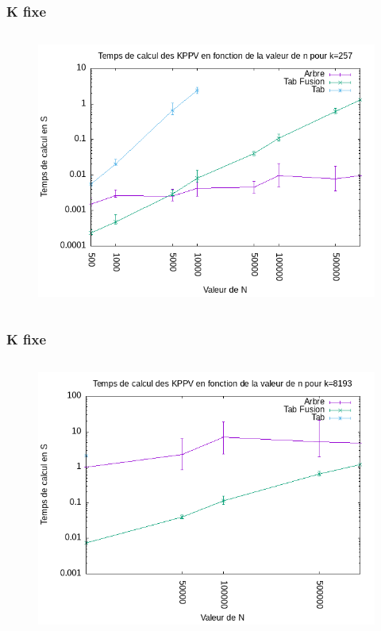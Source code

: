 \documentclass{beamer}
\begin{document}
\begin{frame}
\frametitle{K fixe}
\begin{columns}
    \begin{figure}
      \includegraphics[width=\textwidth]{img_graph/graph_k_257.png}
    \end{figure}
\end{columns}
\end{frame}

\begin{frame}
\frametitle{K fixe}
\begin{columns}
    \begin{figure}
      \includegraphics[width=\textwidth]{img_graph/graph_k_8193.png}
    \end{figure}
\end{columns}
\end{frame}
\end{document}
